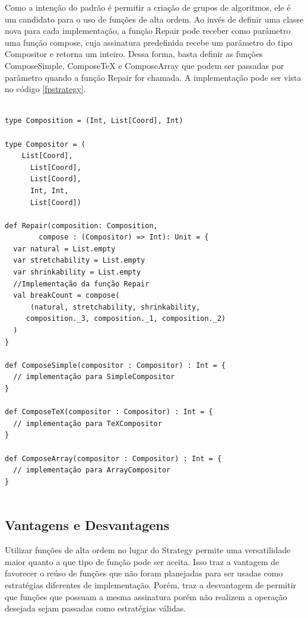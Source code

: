 Como a intenção do padrão é permitir a criação de 
grupos de algoritmos, ele é um candidato para o uso 
de funções de alta ordem. Ao invés de definir 
uma classe nova para cada implementação, a 
função Repair pode receber como parâmetro uma 
função compose, cuja assinatura predefinida 
recebe um parâmetro do tipo Compositor e retorna 
um inteiro. Dessa forma, basta definir as 
funções ComposeSimple, ComposeTeX e ComposeArray 
que podem ser passadas por parâmetro quando a 
função Repair for chamada. A implementação pode 
ser vista no código \ref{fpstrategy}.

\begin{lstlisting}[caption={Strategy Funcional},label=fpstrategy]
    
type Composition = (Int, List[Coord], Int)

type Compositor = (
    List[Coord],
      List[Coord],
      List[Coord],
      Int, Int,
      List[Coord])

def Repair(composition: Composition,
        compose : (Compositor) => Int): Unit = {
  var natural = List.empty
  var stretchability = List.empty
  var shrinkability = List.empty
  //Implementação da função Repair
  val breakCount = compose(
      (natural, stretchability, shrinkability,
     composition._3, composition._1, composition._2)
  )
}

def ComposeSimple(compositor : Compositor) : Int = {
  // implementação para SimpleCompositor
}

def ComposeTeX(compositor : Compositor) : Int = {
  // implementação para TeXCompositor
}

def ComposeArray(compositor : Compositor) : Int = {
  // implementação para ArrayCompositor
}
    
\end{lstlisting}


\subsection*{Vantagens e Desvantagens}

Utilizar funções de alta ordem no lugar do 
Strategy permite uma versatilidade maior quanto 
a que tipo de função pode ser aceita. Isso traz 
a vantagem de favorecer o reúso de funções que não 
foram planejadas para ser usadas como estratégias 
diferentes de implementação. Porém, traz a desvantagem 
de permitir que funções que possuam a mesma assinatura 
porém não realizem a operação desejada sejam passadas 
como estratégias válidas.